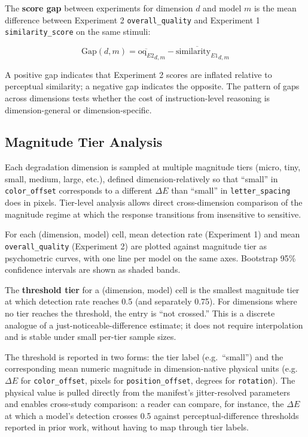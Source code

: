 The \textbf{score gap} between experiments for dimension $d$ and model $m$ is the mean difference between Experiment 2 \texttt{overall\_quality} and Experiment 1 \texttt{similarity\_score} on the same stimuli:

\[\text{Gap}(d, m) = \overline{\text{oq}_{E2}}_{d,m} - \overline{\text{similarity}_{E1}}_{d,m}\]

A positive gap indicates that Experiment 2 scores are inflated relative to perceptual similarity; a negative gap indicates the opposite. The pattern of gaps across dimensions tests whether the cost of instruction-level reasoning is dimension-general or dimension-specific.

\subsection{Magnitude Tier Analysis} \label{Magnitude Tier Analysis}

Each degradation dimension is sampled at multiple magnitude tiers (micro, tiny, small, medium, large, etc.), defined dimension-relatively so that ``small'' in \texttt{color\_offset} corresponds to a different $\Delta E$ than ``small'' in \texttt{letter\_spacing} does in pixels. Tier-level analysis allows direct cross-dimension comparison of the magnitude regime at which the response transitions from insensitive to sensitive.

For each (dimension, model) cell, mean detection rate (Experiment 1) and mean \texttt{overall\_quality} (Experiment 2) are plotted against magnitude tier as psychometric curves, with one line per model on the same axes. Bootstrap 95\% confidence intervals are shown as shaded bands.

The \textbf{threshold tier} for a (dimension, model) cell is the smallest magnitude tier at which detection rate reaches 0.5 (and separately 0.75). For dimensions where no tier reaches the threshold, the entry is ``not crossed.'' This is a discrete analogue of a just-noticeable-difference estimate; it does not require interpolation and is stable under small per-tier sample sizes.

The threshold is reported in two forms: the tier label (e.g.\ ``small'') and the corresponding mean numeric magnitude in dimension-native physical units (e.g.\ $\Delta E$ for \texttt{color\_offset}, pixels for \texttt{position\_offset}, degrees for \texttt{rotation}). The physical value is pulled directly from the manifest's jitter-resolved parameters and enables cross-study comparison: a reader can compare, for instance, the $\Delta E$ at which a model's detection crosses 0.5 against perceptual-difference thresholds reported in prior work, without having to map through tier labels.

